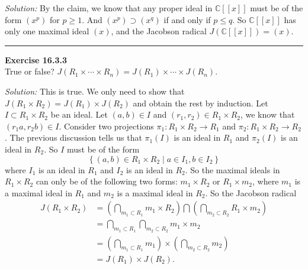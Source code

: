 \documentclass[a4paper, 12pt]{article}
\newenvironment{problem}[2][Exercise]
    { \begin{mdframed}[backgroundcolor=gray!20] \textbf{#1 #2} \\}
    {  \end{mdframed}}
\newenvironment{solution}
    {\textit{Solution:}}
    {}
\begin{document}
\begin{solution}
By the claim, we know that any proper ideal in \(\mathbb{C}[[x]]\) must be of the form \((x^p)\) for \(p\geq 1\). And \((x^p)\supset (x^q)\) if and only if \(p\leq q\). So \(\mathbb{C}[[x]]\) has only one maximal ideal \((x)\), and the Jacobson radical 
\(J(\mathbb{C}[[x]])=(x)\).
\end{solution}

\noindent\rule{7in}{2.8pt}
\begin{problem}{16.3.3}
True or false? \(J(R_1\times \cdots\times R_n)=J(R_1)\times \cdots\times J(R_n)\).
\end{problem}
\begin{solution}
This is true. We only need to show that \(J(R_1\times R_2)=J(R_1)\times J(R_2)\) and obtain the rest by induction. Let \(I\subset R_1\times R_2\) be an ideal. Let \((a,b)\in I\) and \((r_1,r_2)\in R_1\times R_2\), we know that 
\((r_1a,r_2b)\in I\). Consider two projections \(\pi_1:R_1\times R_2\rightarrow R_1\) and \(\pi_2:R_1\times R_2\rightarrow R_2\). The previous discussion tells us that \(\pi_1(I)\) is an ideal in \(R_1\) and \(\pi_2(I)\) is an ideal 
in \(R_2\). So \(I\) must be of the form 
\[\left\{ (a,b)\in R_1\times R_2\mid a\in I_1,b\in I_2 \right\}\]
where \(I_1\) is an ideal in \(R_1\) and \(I_2\) is an ideal in \(R_2\). So the maximal ideals in \(R_1\times R_2\) can only be of the following two forms: \(m_1\times R_2\) or \(R_1\times m_2\), where \(m_1\) is a maximal ideal in \(R_1\) and 
\(m_2\) is a maximal ideal in \(R_2\). So the Jacobson radical 
\begin{align*}
J(R_1\times R_2)&=(\bigcap_{m_1\subset R_1}m_1\times R_2)\bigcap(\bigcap_{m_2\subset R_2}R_1\times m_2)\\ 
                &=\bigcap_{m_1\subset R_1}\bigcap_{m_2\subset R_2}m_1\times m_2\\ 
                &=(\bigcap_{m_1\subset R_1}m_1)\times (\bigcap_{m_2\subset R_2}m_2)\\ 
                &=J(R_1)\times J(R_2).
\end{align*}
\end{solution}
\end{document}
